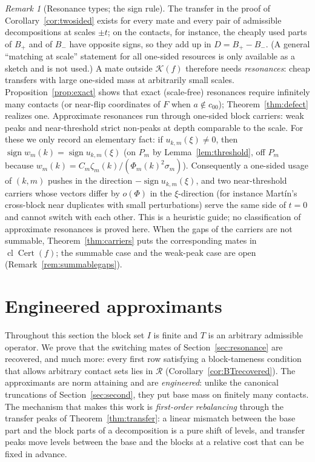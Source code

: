 \documentclass[10pt]{amsart}
\theoremstyle{definition}
\theoremstyle{remark}
\newtheorem{remark}[theorem]{Remark}
\newcommand{\sgn}{\operatorname{sign}}
\newcommand{\Cert}{\operatorname{Cert}}
\newcommand{\cl}{\operatorname{cl}}
\newcommand{\Rec}{\mathcal R}
\begin{document}
\begin{remark}[Resonance types; the sign rule]\label{rem:resonancetypes}
The transfer in the proof of Corollary~\ref{cor:twosided} exists for every
mate and every pair of admissible decompositions at scales $\pm t$; on the
contacts, for instance, the cheaply used parts of $B_+$ and of $B_-$ have
opposite signs, so they add up in $D=B_+-B_-$.  (A general ``matching at
scale'' statement for all one-sided resources is only available as a
sketch and is not used.)  A mate outside $\mathcal
K(f)$ therefore needs \emph{resonances}: cheap transfers with large
one-sided mass at arbitrarily small scales.  Proposition~\ref{prop:exact}
shows that exact (scale-free) resonances require infinitely many contacts
(or near-flip coordinates of $F$ when $a\notin c_{00}$);
Theorem~\ref{thm:defect} realizes one.  Approximate resonances run through
one-sided block carriers: weak peaks and near-threshold strict non-peaks
at depth comparable to the scale.  For these we only record an elementary
fact: if $u_{k,m}(\xi)\ne0$, then $\sgn w_m(k)=\sgn u_{k,m}(\xi)$ (on $P_m$
by Lemma~\ref{lem:threshold}, off $P_m$ because $w_m(k)=C_m\zeta_m(k)/
(\Phi_m(k)^2\sigma_m)$).  Consequently a one-sided usage of $(k,m)$ pushes in
the direction $-\sgn u_{k,m}(\xi)$, and two near-threshold carriers whose
vectors differ by $o(\Phi)$ in the $\xi$-direction (for instance Mart\'in's
cross-block near duplicates with small perturbations) serve the same side
of $t=0$ and cannot switch with each other.  This is a heuristic guide; no
classification of approximate resonances is proved here.  When the gaps of
the carriers are not summable, Theorem~\ref{thm:carriers} puts the
corresponding mates in $\cl\Cert(f)$; the summable case and the weak-peak
case are open (Remark~\ref{rem:summablegaps}).
\end{remark}

\section{Engineered approximants}\label{sec:engineered}

Throughout this section the block set $I$ is finite and $T$ is an arbitrary
admissible operator.  We prove that the switching mates of
Section~\ref{sec:resonance} are recovered, and much more: every first row
satisfying a block-tameness condition that allows arbitrary contact sets
lies in $\Rec$ (Corollary~\ref{cor:BTrecovered}).  The approximants are
norm attaining and are \emph{engineered}: unlike the canonical truncations
of Section~\ref{sec:second}, they put base mass on finitely many contacts.
The mechanism that makes this work is \emph{first-order rebalancing}
through the transfer peaks of Theorem~\ref{thm:transfer}: a linear
mismatch between the base part and the block parts of a decomposition is a
pure shift of levels, and transfer peaks move levels between the base and
the blocks at a relative cost that can be fixed in advance.
\end{document}
